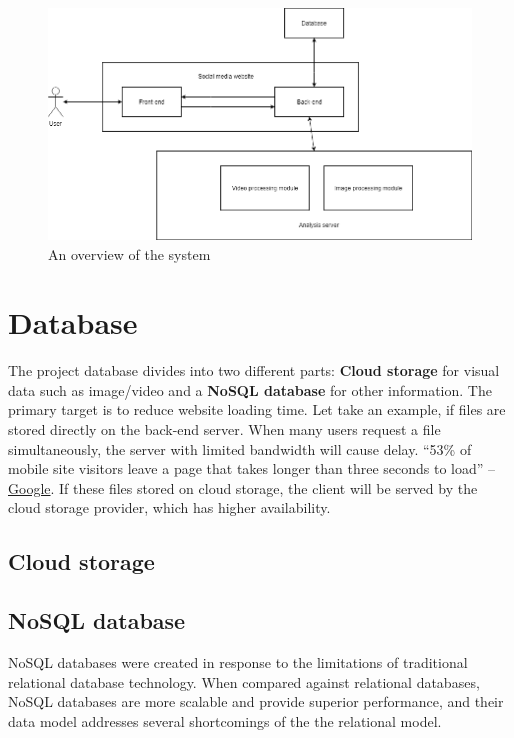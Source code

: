 \begin{center}
    \begin{figure}[H]
    \centering
    \includegraphics[width=1\columnwidth]{images/chap3/system_overview_basic.png}
    \caption{An overview of the system}
    \label{chap3:system_overview_basic}
    \end{figure}
\end{center}
\section{Database}
The project database divides into two different parts: \textbf{Cloud storage} for visual data such as image/video and a \textbf{NoSQL database} for other information. The primary target is to reduce website loading time. Let take an example, if files are stored directly on the back-end server. When many users request a file simultaneously, the server with limited bandwidth will cause delay. “53\% of mobile site visitors leave a page that takes longer than three seconds to load” – \href{https://think.storage.googleapis.com/docs/mobile-page-speed-new-industry-benchmarks.pdf}{Google}. If these files stored on cloud storage, the client will be served by the cloud storage provider, which has higher availability.
\subsection{Cloud storage}

\subsection{NoSQL database}
NoSQL databases were created in response to the limitations of traditional relational database technology. When compared against relational databases, NoSQL databases are more scalable and provide superior performance, and their data model addresses several shortcomings of the the relational model.

